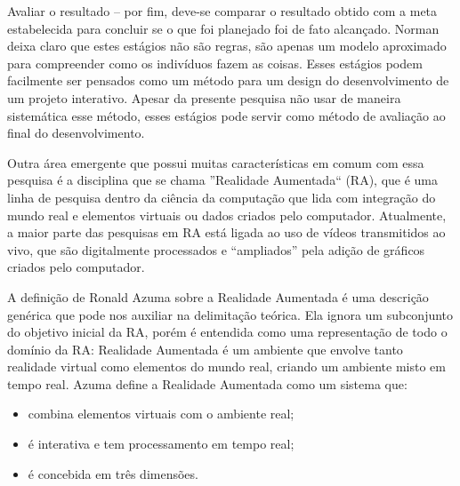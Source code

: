\documentclass{ppgmus}
\begin{document}
Avaliar o resultado – por fim, deve-se comparar o resultado
obtido com a meta estabelecida para concluir se o que foi
planejado foi de fato alcançado.
Norman deixa claro que estes estágios não são regras,
são apenas um modelo aproximado para compreender como
os indivíduos fazem as coisas. Esses estágios podem facilmente
ser pensados como um método para um design do desenvolvimento 
de um projeto interativo. Apesar da presente pesquisa não usar de 
maneira sistemática esse método, esses estágios pode servir como
método de avaliação ao final do desenvolvimento.

Outra área emergente que possui muitas características em comum com essa
pesquisa é a disciplina que se chama ''Realidade Aumentada`` (RA), que é uma linha de pesquisa dentro da ciência da computação que lida com 
integração do mundo real e elementos virtuais ou dados criados pelo computador. Atualmente, a 
maior parte das pesquisas em RA está ligada ao uso de vídeos transmitidos ao vivo, que são 
digitalmente processados e “ampliados” pela adição de gráficos criados pelo computador.

A definição de Ronald Azuma 
sobre a Realidade Aumentada \cite{azuma97:ar} é uma descrição genérica que pode nos auxiliar na delimitação teórica. 
Ela ignora um subconjunto do objetivo inicial da RA, porém é entendida como uma representação 
de todo o domínio da RA: Realidade Aumentada é um ambiente que envolve tanto realidade virtual 
como elementos do mundo real, criando um ambiente misto em tempo real.
Azuma define a Realidade Aumentada como um sistema que:
\begin{itemize}
 \item combina elementos virtuais com o ambiente real; 
  \item é interativa e tem processamento em tempo real; 
  \item  é concebida em três dimensões.
\end{itemize}
\end{document}
